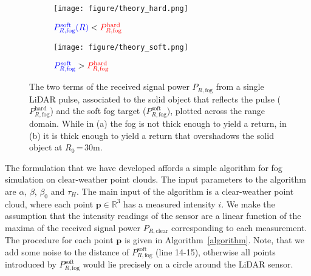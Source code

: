 \documentclass[10pt,twocolumn,letterpaper]{article}
\begin{document}
\begin{figure}
     \centering
     \begin{subfigure}[b]{0.49\linewidth}
         \centering
         \texttt{[image: figure/theory\_hard.png]}
         \caption{$\color{blue} P^{\text{soft}}_{R,\text{fog}}(R) 
         \color{black} < \color{red} P^{\text{hard}}_{R,\text{fog}}$}
         \label{fig:theory_hard}
     \end{subfigure}
     \hfill
     \begin{subfigure}[b]{0.49\linewidth}
         \centering
         \texttt{[image: figure/theory\_soft.png]}
         \caption{$\color{blue} P^{\text{soft}}_{R,\text{fog}} 
         \color{black} > \color{red} P^{\text{hard}}_{R,\text{fog}}$}
         \label{fig:theory_soft}
     \end{subfigure}
     \caption{The two terms of the received signal power $P_{R,\text{fog}}$ from a single LiDAR pulse, associated to the solid object that reflects the pulse ($P_{R,\text{fog}}^{\text{hard}}$) and the soft fog target ($P_{R,\text{fog}}^{\text{soft}}$), plotted across the range domain. While in (a) the fog is not thick enough to yield a return, in (b) it is thick enough to yield a return that overshadows the solid object at $R_0$\,=\,$30\text{m}$.}
     \label{fig:theory}
\end{figure}

The formulation that we have developed affords a simple algorithm for fog simulation on clear-weather point clouds. The input parameters to the algorithm are $\alpha$, $\beta$, $\beta_0$ and $\tau_H$. The main input of the algorithm is a clear-weather point cloud, where each point $\mathbf{p} \in \mathbb{R}^3$ has a measured intensity $i$. We make the assumption that the intensity readings of the sensor are a linear function of the maxima of the received signal power $P_{R,\text{clear}}$ corresponding to each measurement. The procedure for each point $\mathbf{p}$ is given in Algorithm~\ref{algorithm}. Note, that we add some noise to the distance of $P_{R,\text{fog}}^{\text{soft}}$ (line 14-15), otherwise all points introduced by $P_{R,\text{fog}}^{\text{soft}}$ would lie precisely on a circle around the LiDAR sensor.
\end{document}
